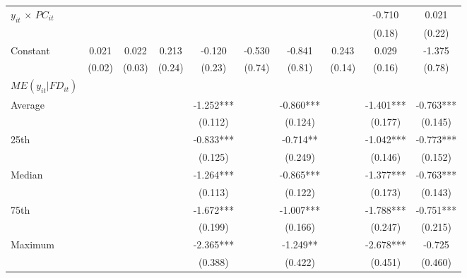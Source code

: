 \documentclass[12pt, a4paper]{article}
\begin{document}
\begin{table}[htbp]
\begin{threeparttable}
{\begin{tabular}{l*{9}{c}}
				$y_{it}$ $\times$ $PC_{it}$ &                     &                     &                     &                     &                     &                     &                     &      -0.710\sym{***}&       0.021         \\
				&                     &                     &                     &                     &                     &                     &                     &      (0.18)         &      (0.22)         \\
				Constant            &       0.021         &       0.022         &       0.213         &      -0.120         &      -0.530         &      -0.841         &       0.243         &       0.029         &      -1.375         \\
				&      (0.02)         &      (0.03)         &      (0.24)         &      (0.23)         &      (0.74)         &      (0.81)         &      (0.14)         &      (0.16)         &      (0.78)         \\
				\hline
				$ME(y_{it}|FD_{it})$ \\
				Average&&&&	-1.252***	&&	-0.860***	&&	-1.401***	&	-0.763***\\
				&&&&(0.112)   &&		(0.124)   	&&	(0.177)   	&	(0.145)   \\
				
				25th&&&&	-0.833***	&&	-0.714** &&		-1.042***	&	-0.773***\\
				&&&&(0.125)  && 		(0.249)   	&&	(0.146)   	&	(0.152)   \\
				
				Median&&&&	-1.264***	&&	-0.865***	&&	-1.377***	&	-0.763***\\
				&&&&(0.113)  &&		(0.122) && 		(0.173)   &		(0.143)   \\
				
				75th&&&&	-1.672***	&&	-1.007***	&&	-1.788***	&	-0.751***\\
				&&&&(0.199)   	&&	(0.166)   	&&	(0.247)   &	(0.215)   \\
				
				Maximum	&&&& -2.365***&&		-1.249** &&		-2.678***	&	-0.725   \\
				&&&&(0.388)   	&&	(0.422)   	&&	(0.451)  &		(0.460)   \\
				
				
				

\end{tabular}}
\end{threeparttable}
\end{table}
\end{document}

